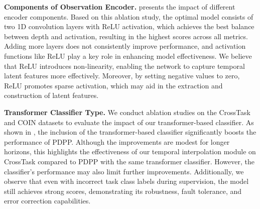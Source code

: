 \textbf{Components of Observation Encoder.}  presents the impact of different encoder components. Based on this ablation study, the optimal model consists of two 1D convolution layers with ReLU activation, which achieves the best balance between depth and activation, resulting in the highest scores across all metrics. Adding more layers does not consistently improve performance, and activation functions like ReLU play a key role in enhancing model effectiveness. We believe that ReLU introduces non-linearity, enabling the network to capture temporal latent features more effectively. Moreover, by setting negative values to zero, ReLU promotes sparse activation, which may aid in the extraction and construction of latent features.

\textbf{Transformer Classifier Type.} We conduct ablation studies on the CrossTask and COIN datasets to evaluate the impact of our transformer-based classifier. As shown in , the inclusion of the transformer-based classifier significantly boosts the performance of PDPP. Although the improvements are modest for longer horizons, this highlights the effectiveness of our temporal interpolation module on CrossTask compared to PDPP with the same transformer classifier. However, the classifier's performance may also limit further improvements. Additionally, we observe that even with incorrect task class labels during supervision, the model still achieves strong scores, demonstrating its robustness, fault tolerance, and error correction capabilities. 


\begin{table}[t]
\centering
\caption{Ablation study on the role of classifier type on CrossTask dataset.}
\vspace{-3mm}
\label{tab:classifier_crosstask}
\end{table}

